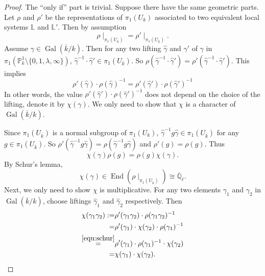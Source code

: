 \documentclass[12pt,twoside]{book}
\theoremstyle{plain}
\theoremstyle{definition}
\theoremstyle{remark}
\newcommand{\bL}{{\mathbb L}}
\newcommand{\bP}{{\mathbb P}}
\DeclareMathOperator\End{End}
\DeclareMathOperator\Gal{Gal}
\newcommand{\Qbar}{{\overline{\mathbb Q}}}
\numberwithin{equation}{section}
\begin{document}
\begin{proof} The ``only if'' part is trivial. Suppose there have the same geometric parts. Let $\rho$ and $\rho'$ be the representations of $\pi_1(U_k)$ associated to two equivalent local systems $\bL$ and $\bL'$. Then by assumption
\[\rho\mid_{\pi_1(U_{\overline k})} = \rho'\mid_{\pi_1(U_{\overline k})}.\]
Assume $\gamma \in \Gal(\overline{k}/k)$. Then for any two lifting $\widehat\gamma$ and $\widehat{\gamma}'$ of $\gamma$ in $\pi_1(\bP^1_k\setminus\{0,1,\lambda,\infty\})$, $\widehat\gamma^{-1}\cdot \widehat\gamma' \in \pi_1(U_{\overline{k}})$. So $\rho(\widehat\gamma^{-1}\cdot \widehat\gamma') = \rho'(\widehat\gamma^{-1}\cdot \widehat\gamma')$. This implies
\[\rho'(\widehat\gamma)\cdot \rho(\widehat{\gamma})^{-1} = \rho'(\widehat\gamma')\cdot \rho(\widehat{\gamma}')^{-1}\]
In other words, the value $\rho'(\widehat\gamma')\cdot \rho(\widehat{\gamma}')^{-1}$ does not depend on the choice of the lifting, denote it by $\chi(\gamma)$. We only need to show that $\chi$ is a character of $\Gal(\overline{k}/k)$.

Since $\pi_1(U_{\overline{k}})$ is a normal subgroup of $\pi_1(U_k)$, $\widehat\gamma^{-1}g\widehat\gamma \in \pi_1(U_{\overline{k}})$ for any $g\in \pi_1(U_{\overline{k}})$. So $\rho'(\widehat\gamma^{-1}g\widehat\gamma) = \rho(\widehat\gamma^{-1}g\widehat\gamma)$ and $\rho'(g)=\rho(g)$. Thus
\[\chi(\gamma) \rho(g) = \rho(g) \chi(\gamma).\]
By Schur's lemma,
\begin{equation}\label{equ:schur}
\chi(\gamma)\in \End(\rho\mid_{\pi_1(U_{\overline{k}})}) \cong \Qbar_\ell.
\end{equation}
Next, we only need to show $\chi$ is multiplicative. For any two elements $\gamma_1$ and $\gamma_2$ in $\Gal(\overline{k}/k)$, choose liftings $\widehat{\gamma}_1$ and $\widehat{\gamma}_2$ respectively. Then
\begin{equation*}
\begin{split}
\chi(\gamma_1\gamma_2) := & \rho'(\gamma_1\gamma_2)\cdot \rho(\gamma_1\gamma_2)^{-1} \\
= & \rho'(\gamma_1)\cdot\chi(\gamma_2)\cdot\rho(\gamma_1)^{-1} \\
\overset{\eqref{equ:schur}}{=}& \rho'(\gamma_1) \cdot\rho(\gamma_1)^{-1} \cdot \chi(\gamma_2)\\
=&\chi(\gamma_1)\cdot\chi(\gamma_2). \qedhere
\end{split}
\end{equation*}
\end{proof}
\end{document}
